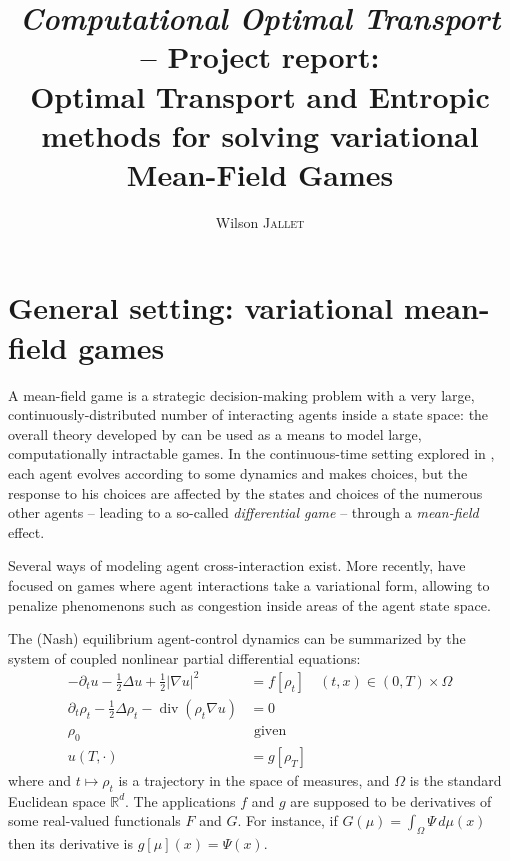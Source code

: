 \documentclass{article}
\author{Wilson \textsc{Jallet}}
\title{
{\large\textit{Computational Optimal Transport} -- \textsf{Project report:}}\\
Optimal Transport and Entropic methods for solving variational Mean-Field Games}
\newcommand{\RR}{\mathbb{R}}
\DeclareMathOperator{\divg}{div}
\numberwithin{equation}{section}
\theoremstyle{definition}
\begin{document}
\maketitle


\section{General setting: variational mean-field games}

A mean-field game \cite{LASRY2006619,LASRY2006679} is a strategic decision-making problem with a very large, continuously-distributed number of interacting agents inside a state space: the overall theory developed by \citeauthor{LASRY2006619} can be used as a means to model large, computationally intractable games. In the continuous-time setting explored in \cite{LASRY2006679}, each agent evolves according to some dynamics and makes choices, but the response to his choices are affected by the states and choices of the numerous other agents -- leading to a so-called \textit{differential game} -- through a \textit{mean-field} effect.

Several ways of modeling agent cross-interaction exist. More recently, \cite{benamou:hal-01295299} have focused on games where agent interactions take a variational form, allowing to penalize phenomenons such as congestion inside areas of the agent state space.


The (Nash) equilibrium agent-control dynamics can be summarized by the system of coupled nonlinear partial differential equations:
\begin{subequations}\label{eq:VariationalQuadraticMFG}
\begin{align}\label{eq:VarQuadMFGHJB}
	-\partial_t u - \frac{1}{2}\Delta u + \frac12|\nabla u|^2 &= f[\rho_t] \quad (t,x) \in  (0, T) \times \Omega \\\label{eq:VarQuadMFGKolmo}
	\partial_t \rho_t - \frac{1}{2}\Delta\rho_t - \divg(\rho_t \nabla u) &= 0 \\
	\rho_0 &\text{ given} \\
	u(T, \cdot) &= g[\rho_T]
\end{align}
\end{subequations}
where and $t\mapsto \rho_t$ is a trajectory in the space of measures, and $\Omega$ is the standard Euclidean space $\RR^d$. The applications $f$ and $g$ are supposed to be derivatives of some real-valued functionals $F$ and $G$. For instance, if $G(\mu) = \int_\Omega \Psi\,d\mu(x)$ then its derivative is $g[\mu](x) = \Psi(x)$.
\end{document}
